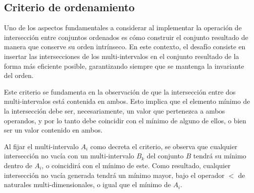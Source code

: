 \subsection{Criterio de ordenamiento}

Uno de los aspectos fundamentales a considerar al implementar la operación de intersección entre conjuntos ordenados es cómo construir el conjunto resultado de manera que conserve su orden intrínseco. En este contexto, el desafío consiste en insertar las intersecciones de los multi-intervalos en el conjunto resultado de la forma más eficiente posible, garantizando siempre que se mantenga la invariante del orden.

\begin{center}
\end{center}


Este criterio se fundamenta en la observación de que la intersección entre dos multi-intervalos está contenida en ambos. Esto implica que el elemento mínimo de la intersección debe ser, necesariamente, un valor que pertenezca a ambos operandos, y por lo tanto debe coincidir con el mínimo de alguno de ellos, o bien ser un valor contenido en ambos.

Al fijar el multi-intervalo $A_i$ como decreta el criterio, se observa que cualquier intersección no vacía con un multi-intervalo $B_k$ del conjunto $B$ tendrá su mínimo dentro de $A_i$, o coincidirá con el mínimo de este. Como resultado, cualquier intersección no vacía generada tendrá un mínimo mayor, bajo el operador $<$ de naturales multi-dimensionales, o igual que el mínimo de $A_i$.

